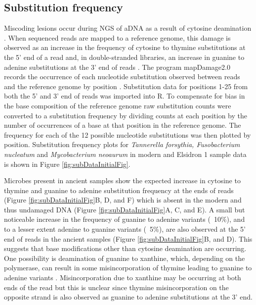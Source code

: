 \documentclass[12pt, a4paper]{article}
\begin{document}
\subsection{Substitution frequency}
Miscoding lesions occur during NGS of aDNA as a result of cytosine deamination \cite{Stiller:2006aa}.
When sequenced reads are mapped to a reference genome, this damage is observed as an increase in the frequency of cytosine to thymine substitutions at the 5' end of a read and, in double-stranded libraries, an increase in guanine to adenine substitutions at the 3' end of reads \cite{Briggs:2007aa}.
The program mapDamage2.0 records the occurrence of each nucleotide substitution observed between reads and the reference genome by position \cite{Jonsson:2013aa}.
Substitution data for positions 1-25 from both the 5' and 3' end of reads was imported into R. 
To compensate for bias in the base composition of the reference genome raw substitution counts were converted to a substitution frequency by dividing counts at each position by the number of occurrences of a base at that position in the reference genome. 
The frequency for each of the 12 possible nucleotide substitutions was then plotted by position.
Substitution frequency plots for \textit{Tannerella forsythia, Fusobacterium nucleatum} and \textit{Mycobacterium neoaurum} in modern and Elsidron 1 sample data is shown in Figure \ref{fig:subDataInitialFig}.

Microbes present in ancient samples show the expected increase in cytosine to thymine and guanine to adenine substitution frequency at the ends of reads (Figure \ref{fig:subDataInitialFig}B, D, and F)  which is absent in the modern and thus undamaged DNA (Figure \ref{fig:subDataInitialFig}A, C, and E).
A small but noticeable increase in the frequency of guanine to adenine variants (~10\%), and to a lesser extent adenine to guanine variants (~5\%), are also observed at the 5' end of reads in the ancient samples (Figure \ref{fig:subDataInitialFig}B, and D). 
This suggests that base modifications other than cytosine deamination are occurring.
One possibility is deamination of guanine to xanthine, which, depending on the polymerase, can result in some misincorporation of thymine leading to guanine to adenine variants \cite{Stiller:2006aa}.
Misincorporation due to xanthine may be occurring at both ends of the read but this is unclear since thymine misincorporation on the opposite strand is also observed as guanine to adenine substitutions at the 3' end.
\end{document}
